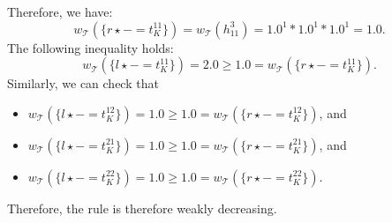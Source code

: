 \begin{example}
\begin{center}
{
        }
      \end{center}
    Therefore, we have: $$w_\mathcal{T}(\{r \star - = t_K^{11}\}) = w_\mathcal{T}(h_{11}^3) = 1.0^1 * 1.0^1 * 1.0 ^ 1 = 1.0.$$
    The following inequality holds:
    $$w_\mathcal{T}(\{l \star - = t_K^{11}\}) = 2.0 \geq 1.0 = w_\mathcal{T}(\{r \star - = t_K^{11}\}).$$
    Similarly, we can check that 
        \begin{itemize}
            \item $w_\mathcal{T}(\{l \star - = t_K^{12}\}) = 1.0 \geq 1.0 = w_\mathcal{T}(\{r \star - = t_K^{12}\})$, and
            \item $w_\mathcal{T}(\{l \star - = t_K^{21}\}) = 1.0 \geq 1.0 = w_\mathcal{T}(\{r \star - = t_K^{21}\})$, and
            \item $w_\mathcal{T}(\{l \star - = t_K^{22}\}) = 1.0 \geq 1.0 = w_\mathcal{T}(\{r \star - = t_K^{22}\})$.
        \end{itemize}
    Therefore, the rule is therefore weakly decreasing.
    

\end{example}

